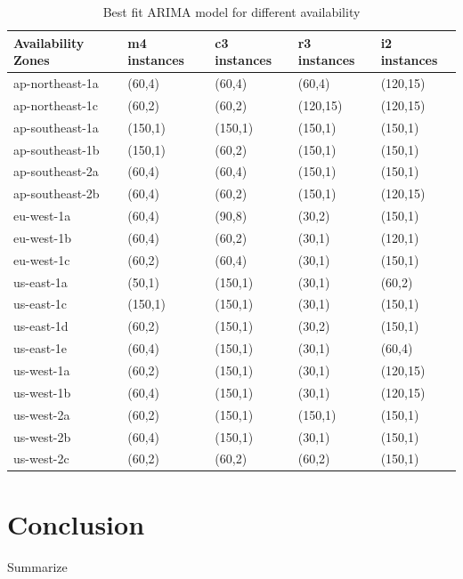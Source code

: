 \documentclass[graybox]{svmult}
\begin{document}
\begin{table}
\begin{tabular}{ |p{2.5cm}||p{2cm}||p{2cm}| |p{2cm}||p{2cm}|}
\small
Availability Zones &m4 instances&c3 instances&r3 instances& i2 instances\\\hline 
ap-northeast-1a& (60,4)&(60,4)&(60,4)&(120,15)\\
ap-northeast-1c&(60,2)&(60,2)&(120,15)&(120,15)\\
ap-southeast-1a&(150,1)&(150,1)&(150,1)&(150,1)\\
ap-southeast-1b&(150,1)&(60,2)&(150,1)&(150,1)\\
ap-southeast-2a&(60,4)&(60,4)&(150,1)&(150,1)\\
ap-southeast-2b&(60,4)&(60,2)&(150,1)&(120,15)\\
eu-west-1a&(60,4)&(90,8)&(30,2)&(150,1)\\
eu-west-1b&(60,4)&(60,2)&(30,1)&(120,1)\\
eu-west-1c&(60,2)&(60,4)&(30,1)&(150,1)\\
us-east-1a&(50,1)&(150,1)&(30,1)&(60,2)\\
us-east-1c&(150,1)&(150,1)&(30,1)&(150,1)\\
us-east-1d&(60,2)&(150,1)&(30,2)&(150,1)\\
us-east-1e&(60,4)&(150,1)&(30,1)&(60,4)\\
us-west-1a&(60,2)&(150,1)&(30,1)&(120,15)\\
us-west-1b&(60,4)&(150,1)&(30,1)&(120,15)\\
us-west-2a&(60,2)&(150,1)&(150,1)&(150,1)\\
us-west-2b&(60,4)&(150,1)&(30,1)&(150,1)\\
us-west-2c&(60,2)&(60,2)&(60,2)&(150,1)\\
\end{tabular}
\caption{Best fit ARIMA model for different availability}
\label{table:1}
\end{table}
\section{Conclusion}
Summarize


\end{document}

